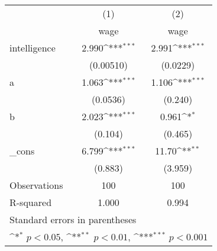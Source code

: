 {
\def\sym#1{\ifmmode^{#1}\else\(^{#1}\)\fi}
\begin{tabular}{l*{2}{c}}
\hline\hline
            &\multicolumn{1}{c}{(1)}&\multicolumn{1}{c}{(2)}\\
            &\multicolumn{1}{c}{wage}&\multicolumn{1}{c}{wage}\\
\hline
intelligence&       2.990\sym{***}&       2.991\sym{***}\\
            &   (0.00510)         &    (0.0229)         \\
[1em]
a           &       1.063\sym{***}&       1.106\sym{***}\\
            &    (0.0536)         &     (0.240)         \\
[1em]
b           &       2.023\sym{***}&       0.961\sym{*}  \\
            &     (0.104)         &     (0.465)         \\
[1em]
\_cons      &       6.799\sym{***}&       11.70\sym{**} \\
            &     (0.883)         &     (3.959)         \\
\hline
Observations&         100         &         100         \\
R-squared   &       1.000         &       0.994         \\
\hline\hline
\multicolumn{3}{l}{\footnotesize Standard errors in parentheses}\\
\multicolumn{3}{l}{\footnotesize \sym{*} \(p<0.05\), \sym{**} \(p<0.01\), \sym{***} \(p<0.001\)}\\
\end{tabular}
}
